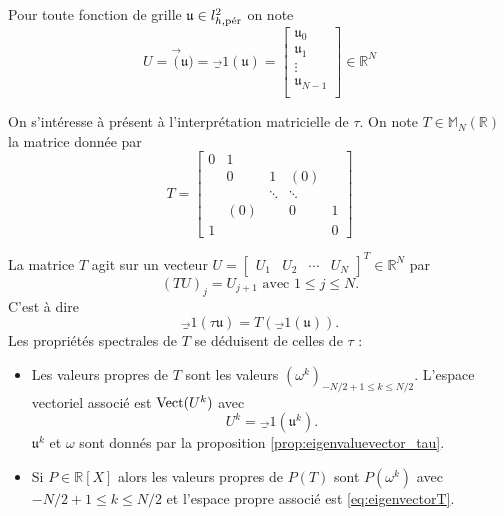 Pour toute fonction de grille $\mathfrak{u} \in l^2_{h,\per}$ on note
\begin{equation}
U = \vec( \mathfrak{u} ) = \vec_1( \mathfrak{u} ) = \begin{bmatrix}
\mathfrak{u}_0\\
\mathfrak{u}_1\\
\vdots\\
\mathfrak{u}_{N-1}\\
\end{bmatrix} \in \mathbb{R}^N
\end{equation}

On s'intéresse à présent à l'interprétation matricielle de $\tau$. On note $T \in \mathbb{M}_N (\mathbb{R})$ la matrice donnée par
\begin{equation}
T = \begin{bmatrix}
0 & 1 &   &   &   \\ 
  & 0 & 1 & (0) &   \\ 
  &   & \ddots & \ddots &   \\ 
  & (0) &   & 0 & 1 \\ 
1 &   &   &   & 0
\end{bmatrix} 
\label{eq:matrice_translation}
\end{equation}

La matrice $T$ agit sur un vecteur $U = \begin{bmatrix}
U_1 & U_2 & \cdots & U_{N} 
\end{bmatrix}^T \in \mathbb{R}^N $ par
\begin{equation}
(TU)_j = U_{j+1} \text{ avec } 1 \leq j \leq N.
\end{equation}
C'est à dire
\begin{equation}
\vec_1 ( \tau \mathfrak{u} ) = T ( \vec_1 ( \mathfrak{u} ) ). 
\end{equation}
Les propriétés spectrales de $T$ se déduisent de celles de $\tau$ :
\begin{corollaire}
\begin{itemize}
\item Les valeurs propres de $T$ sont les valeurs $(\omega^k)_{-N/2+1 \leq k \leq N/2}$. 
L'espace vectoriel associé est $\Vect ( U^k )$ avec
\begin{equation}
U^k = \vec_1 (\mathfrak{u}^k ).
\label{eq:eigenvectorT}
\end{equation}
$\mathfrak{u}^k$ et $\omega$ sont donnés par la proposition \ref{prop:eigenvaluevector_tau}.

\item Si $P \in \mathbb{R}[X]$ alors les valeurs propres de $P(T)$ sont $P(\omega^k)$ avec $-N/2 + 1 \leq k \leq N/2$ et l'espace propre associé est \eqref{eq:eigenvectorT}.
\end{itemize}
\label{prop:eigen_P(T)}
\end{corollaire}


